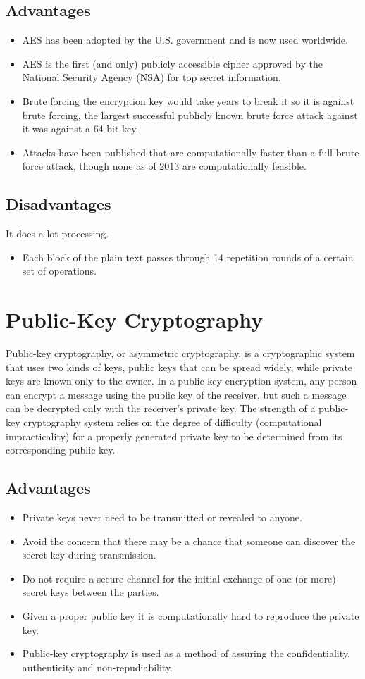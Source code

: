 \subsection{Advantages}
\begin{itemize}
	\item AES has been adopted by the U.S. government and is now used worldwide.
	\item AES is the first (and only) publicly accessible cipher approved by the National Security Agency (NSA) for top secret information.
	\item Brute forcing the encryption key would take years to break it so it is against brute forcing, the largest successful  publicly known brute force attack against it was against a 64-bit key.
	\item Attacks have been published that are computationally faster than a full brute force attack, though none as of 2013 are computationally feasible.
\end{itemize}

\subsection{Disadvantages}
It does a lot processing.
\begin{itemize}
	\item Each block of the plain text passes through 14 repetition rounds of a certain set of operations.
\end{itemize}

\section{Public-Key Cryptography}
Public-key cryptography, or asymmetric cryptography, is a cryptographic system that uses two kinds of keys, public keys that can be spread widely, while private keys are known only to the owner. In a public-key encryption system, any person can encrypt a message using the public key of the receiver, but such a message can be decrypted only with the receiver's private key. The strength of a public-key cryptography system relies on the degree of difficulty (computational impracticality) for a properly generated private key to be determined from its corresponding public key.
\subsection{Advantages}
\begin{itemize}
	\item Private keys never need to be transmitted or revealed to anyone.
	\item Avoid the concern that there may be a chance that someone can discover the secret key during transmission.
	\item Do not require a secure channel for the initial exchange of one (or more) secret keys between the parties.
	\item Given a proper public key it is computationally hard to reproduce the private key.
	\item Public-key cryptography is used as a method of assuring the confidentiality, authenticity and non-repudiability.
\end{itemize}
